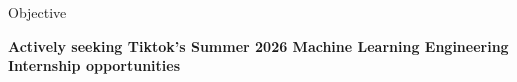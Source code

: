 \begin{rSection}{Objective}
\vspace{-0.5em}
\begin{flushleft}
\begin{minipage}{0.9\linewidth}
\textbf{Actively seeking Tiktok's Summer 2026 Machine Learning Engineering Internship opportunities}
\end{minipage}
\end{flushleft}
\end{rSection}
